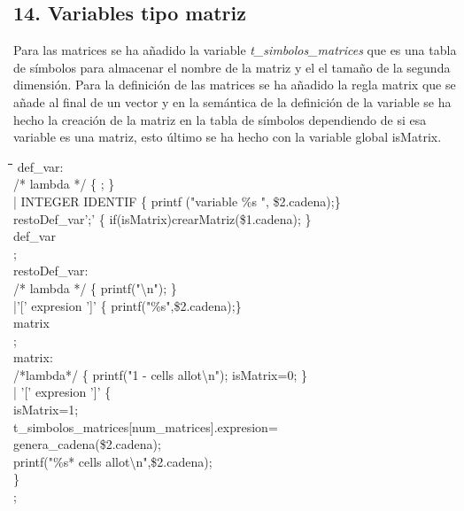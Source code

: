 \documentclass[11pt,spanish]{article}
\begin{document}
		\subsection*{14. Variables tipo matriz }
		\label{subsec:14}
		Para las matrices se ha añadido la variable \textit{t\_simbolos\_matrices} que es una tabla de símbolos para almacenar el nombre de la matriz y el el tamaño de la segunda dimensión. Para la definición de las matrices se ha añadido la regla {\ttfamily matrix} que se añade al final de un vector y en la semántica de la definición de la variable se ha hecho la creación de la matriz en la tabla de símbolos dependiendo de si esa variable es una matriz, esto último se ha hecho con la variable global isMatrix.
		\begin{tcolorbox}
		\begin{tabbing}
			\hspace*{0.5cm}\=\hspace*{1cm}\= \hspace*{3cm}\=\hspace*{0.5cm}\=\hspace*{0.5cm}\=\kill
			def\_var:   \\		   
				\> /* lambda */\> \>		\{ ; \}\\
				\>| INTEGER IDENTIF\> \> \{ printf ("variable \%s ", \$2.cadena);\} \\
				\>\>restoDef\_var';'\> \{ if(isMatrix)crearMatriz(\$1.cadena); \}\\
				\>\>def\_var\\
			;\\ 
			restoDef\_var:\\
			\>/* lambda */\>\> 		\{ printf("\textbackslash n"); \} \\
			\>|'[' expresion ']'\>\>	\{ printf("\%s",\$2.cadena);\} \\
			\>\>matrix\\
			;\\
			matrix:\\
			\>	/*lambda*/\>\>		 	\{ printf("1 - cells allot\textbackslash n"); isMatrix=0; \}\\
			\>	| '[' expresion	']'\>\>	\{\\
			\>\>\>\>						isMatrix=1;\\
			\>\>\>\>						t\_simbolos\_matrices[num\_matrices].expresion=\\
			\>\>\>\>\>genera\_cadena(\$2.cadena);\\
			\>\>\>\>						printf("\%s* cells allot\textbackslash n",\$2.cadena);\\
			\>\>\>						\}\\
			;
		\end{tabbing}
		\end{tcolorbox}
\end{document}
